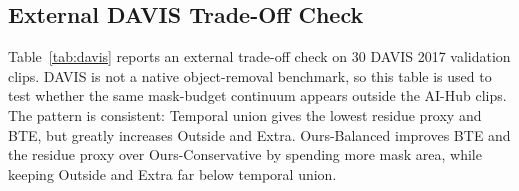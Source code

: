 \documentclass[nouppercase]{kaia}
\begin{document}
\begin{table}[h]
\begin{center}
\end{center}
\caption{Two-radius operating-point grid on 10 AI-Hub clips. Ours-Balanced is the selected representative setting; Ours-Aggressive illustrates the higher-budget end of the same continuum.}
\label{tab:grid}
\end{table}
\subsection{External DAVIS Trade-Off Check}
Table~\ref{tab:davis} reports an external trade-off check on 30 DAVIS 2017 validation clips. DAVIS is not a native object-removal benchmark, so this table is used to test whether the same mask-budget continuum appears outside the AI-Hub clips. The pattern is consistent: Temporal union gives the lowest residue proxy and BTE, but greatly increases Outside and Extra. Ours-Balanced improves BTE and the residue proxy over Ours-Conservative by spending more mask area, while keeping Outside and Extra far below temporal union.
\end{document}
